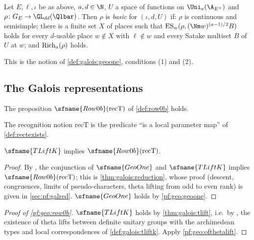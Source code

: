 \begin{definition}\label{pf:geo:vbase}
Let $E,\ell,\iota$ be as above, $a,d\in\N$, $U$ a space of functions on $\geoUa$ and
$\rho\colon G_E\to\GL_{dd}(\Qlbar)$. Then $\rho$ is \emph{basic} for $(\iota,d,U)$ if: $\rho$ is continuous
and semisimple; there is a finite set $X$ of places such that $\geoES_w(\rho,(\Nm w)^{(a-1)/2}B)$ holds
for every $d$-usable place $w\notin X$ with $\ell\notin w$ and every Satake multiset $B$ of $U$ at $w$;
and $\mathrm{Rich}_a(\rho)$ holds.
\end{definition}

This is the notion of \cref{def:galois:geoone}, conditions (1) and (2).

\subsection{The Galois representations}\label{sec:pf:geo:row}

\begin{theorem}\label{pf:geo:row0b}
The proposition $\sfname{Row0b}(\mathrm{recT})$ of \cref{def:row0b} holds.
\end{theorem}

The recognition notion $\mathrm{recT}$ is the predicate ``is a local parameter map'' of
\cref{def:rectexists}.

\begin{proposition}\label{pf:geo:ofthetalift}
$\sfname{TLiftK}$ implies $\sfname{Row0b}(\mathrm{recT})$.
\end{proposition}

\begin{proof}
By , the conjunction of
$\sfname{GeoOne}$ and $\sfname{TLiftK}$ implies $\sfname{Row0b}(\mathrm{recT})$; this is
\cref{thm:galois:reduction}, whose proof (descent, congruences, limits of pseudo-characters, theta
lifting from odd to even rank) is given in \cref{sec:pf:galred}. $\sfname{GeoOne}$ holds by \cref{pf:geo:geoone}.
\end{proof}

\begin{proof}[Proof of \cref{pf:geo:row0b}]
$\sfname{TLiftK}$ holds by \cref{thm:galois:tlift}, i.e.\ by ,
the existence of theta lifts between definite unitary groups with the archimedean types and
local correspondences of \cref{def:galois:tliftk}. Apply \cref{pf:geo:ofthetalift}.
\end{proof}

